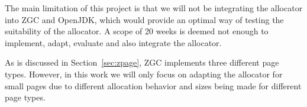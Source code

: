 
The main limitation of this project is that we will not be integrating the allocator into ZGC and OpenJDK, which would provide an optimal way of testing the suitability of the allocator. A scope of 20 weeks is deemed not enough to implement, adapt, evaluate and also integrate the allocator.

As is discussed in Section~\ref{sec:zpage}, ZGC implements three different page types. However, in this work we will only focus on adapting the allocator for small pages due to different allocation behavior and sizes being made for different page types.


